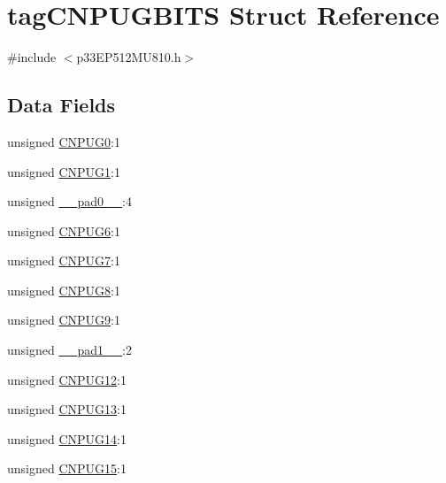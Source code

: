 \hypertarget{structtag_c_n_p_u_g_b_i_t_s}{}\section{tag\+C\+N\+P\+U\+G\+B\+I\+TS Struct Reference}
\label{structtag_c_n_p_u_g_b_i_t_s}


{\ttfamily \#include $<$p33\+E\+P512\+M\+U810.\+h$>$}

\subsection*{Data Fields}
\begin{DoxyCompactItemize}
\item 
unsigned \hyperlink{structtag_c_n_p_u_g_b_i_t_s_abbf6f93a04dce182a1cf75d0275e28ee}{C\+N\+P\+U\+G0}\+:1
\item 
unsigned \hyperlink{structtag_c_n_p_u_g_b_i_t_s_a9536c9302b71fcc829a3ff95436545b0}{C\+N\+P\+U\+G1}\+:1
\item 
unsigned \hyperlink{structtag_c_n_p_u_g_b_i_t_s_adf71f3d8410c1f1dbbc96680a92c49af}{\+\_\+\+\_\+pad0\+\_\+\+\_\+}\+:4
\item 
unsigned \hyperlink{structtag_c_n_p_u_g_b_i_t_s_a315bf6482e974f0974f28d9a585c98d3}{C\+N\+P\+U\+G6}\+:1
\item 
unsigned \hyperlink{structtag_c_n_p_u_g_b_i_t_s_acb0acbd0296d4c02114b87b7b1fd1cd9}{C\+N\+P\+U\+G7}\+:1
\item 
unsigned \hyperlink{structtag_c_n_p_u_g_b_i_t_s_ab1b657a488bafbae533ea7694805a311}{C\+N\+P\+U\+G8}\+:1
\item 
unsigned \hyperlink{structtag_c_n_p_u_g_b_i_t_s_ac759dde0a3314421e6c9cb43a1cca6fa}{C\+N\+P\+U\+G9}\+:1
\item 
unsigned \hyperlink{structtag_c_n_p_u_g_b_i_t_s_acaf2d0924a107ec6e8d2e31febaf66f9}{\+\_\+\+\_\+pad1\+\_\+\+\_\+}\+:2
\item 
unsigned \hyperlink{structtag_c_n_p_u_g_b_i_t_s_aefda0f848b3ec8d2445ef26db42056ea}{C\+N\+P\+U\+G12}\+:1
\item 
unsigned \hyperlink{structtag_c_n_p_u_g_b_i_t_s_a9e22099761b8dfadc25c027a4fabcb10}{C\+N\+P\+U\+G13}\+:1
\item 
unsigned \hyperlink{structtag_c_n_p_u_g_b_i_t_s_a93a2764bda19d25a546a6f86254fa62b}{C\+N\+P\+U\+G14}\+:1
\item 
unsigned \hyperlink{structtag_c_n_p_u_g_b_i_t_s_ad40de6406f9b61c10ab27daf991d09a5}{C\+N\+P\+U\+G15}\+:1
\end{DoxyCompactItemize}


